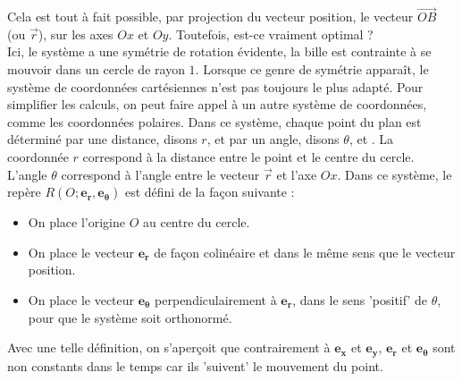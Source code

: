 \documentclass{article}
\begin{document}
\noindent Cela est tout à fait possible, par projection du vecteur position, le vecteur $\vec {OB}$ (ou $\vec r$), sur les axes $Ox$ et $Oy$. Toutefois, est-ce vraiment optimal ?
\\\indent Ici, le système a une symétrie de rotation évidente, la bille est contrainte à se mouvoir dans un cercle de rayon $1$. Lorsque ce genre de symétrie apparaît, le système de coordonnées cartésiennes n'est pas toujours le plus adapté. Pour simplifier les calculs, on peut faire appel à un autre système de coordonnées, comme les coordonnées polaires. Dans ce système, chaque point du plan est déterminé par une distance, disons $r$, et par un angle, disons $\theta$, et . La coordonnée $r$ correspond à la distance entre le point et le centre du cercle. L'angle $\theta$ correspond à l'angle entre le vecteur $\vec r$ et l'axe $Ox$. Dans ce système, le repère $R(O; \mathbf{e_r},\mathbf{e_\theta})$ est défini de la façon suivante :
\begin{itemize}
    \item On place l'origine $O$ au centre du cercle.
    \item On place le vecteur $\mathbf{e_r}$ de façon colinéaire et dans le même sens que le vecteur position. 
    \item On place le vecteur $\mathbf{e_\theta}$ perpendiculairement à $\mathbf{e_r}$, dans le sens 'positif' de $\theta$, pour que le système soit orthonormé.  %
\end{itemize}
 Avec une telle définition, on s'aperçoit que contrairement à  $\mathbf{e_x}$ et  $\mathbf{e_y}$,  $\mathbf{e_r}$ et  $\mathbf{e_\theta}$ sont non constants dans le temps car ils 'suivent' le mouvement du point.
\end{document}
